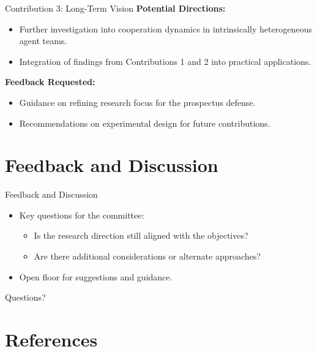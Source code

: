 \documentclass[xcolor={svgnames}]{beamer}
\begin{document}
\begin{frame}{Contribution 3: Long-Term Vision}
    \textbf{Potential Directions:}
    \begin{itemize}
        \item Further investigation 
        into cooperation dynamics in intrinsically heterogeneous agent teams.
        \item Integration of findings from Contributions 1 and 2 into practical applications.
    \end{itemize}
    \textbf{Feedback Requested:}
    \begin{itemize}
        \item Guidance on refining research focus for the prospectus defense.
        \item Recommendations on experimental design for future contributions.
    \end{itemize}
\end{frame}

\section{Feedback and Discussion}

\begin{frame}{Feedback and Discussion}
    \begin{itemize}
        \item Key questions for the committee:
        \begin{itemize}
            \item Is the research direction still aligned with the objectives?
            \item Are there additional considerations or alternate approaches?
        \end{itemize}
        \item Open floor for suggestions and guidance.
    \end{itemize}
\end{frame}

\begin{frame}
    \centering
    \Huge
    Questions?
\end{frame}

\section{References}

\renewcommand*{\bibfont}{\tiny}
\frame[allowframebreaks]{\printbibliography}
\end{document}
